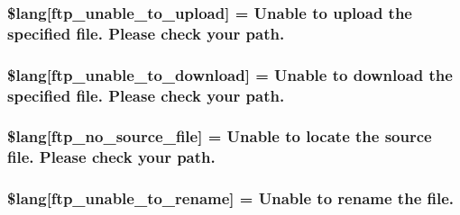 \subsubsection[{\$lang}]{\setlength{\rightskip}{0pt plus 5cm}\$lang\mbox{[}\textquotesingle{}ftp\+\_\+unable\+\_\+to\+\_\+upload\textquotesingle{}\mbox{]} = \textquotesingle{}Unable to upload the specified file. Please check your path.\textquotesingle{}}\label{ftp__lang_8php_a1fd0c9f4e0f3be691a809ce804900ed7}
\hypertarget{ftp__lang_8php_a65fa9f8b6a3da91390b36721c2a9775b}{}
\subsubsection[{\$lang}]{\setlength{\rightskip}{0pt plus 5cm}\$lang\mbox{[}\textquotesingle{}ftp\+\_\+unable\+\_\+to\+\_\+download\textquotesingle{}\mbox{]} = \textquotesingle{}Unable to download the specified file. Please check your path.\textquotesingle{}}\label{ftp__lang_8php_a65fa9f8b6a3da91390b36721c2a9775b}
\hypertarget{ftp__lang_8php_abf3e74ee1af13c9b0f0cc63fbb9081f1}{}
\subsubsection[{\$lang}]{\setlength{\rightskip}{0pt plus 5cm}\$lang\mbox{[}\textquotesingle{}ftp\+\_\+no\+\_\+source\+\_\+file\textquotesingle{}\mbox{]} = \textquotesingle{}Unable to locate the source file. Please check your path.\textquotesingle{}}\label{ftp__lang_8php_abf3e74ee1af13c9b0f0cc63fbb9081f1}
\hypertarget{ftp__lang_8php_ae2715b036a8015f4da2841c15ab8db79}{}
\subsubsection[{\$lang}]{\setlength{\rightskip}{0pt plus 5cm}\$lang\mbox{[}\textquotesingle{}ftp\+\_\+unable\+\_\+to\+\_\+rename\textquotesingle{}\mbox{]} = \textquotesingle{}Unable to rename the file.\textquotesingle{}}\label{ftp__lang_8php_ae2715b036a8015f4da2841c15ab8db79}
\hypertarget{ftp__lang_8php_a922b1d7a3667e2cacb0873788e548dca}{}
